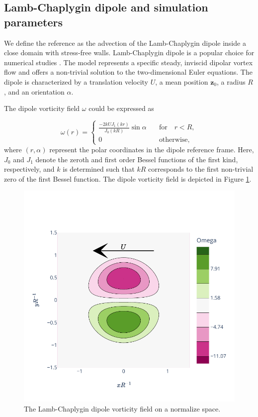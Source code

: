 \subsection{Lamb-Chaplygin dipole and simulation parameters}

We define the reference as the advection of the Lamb-Chaplygin dipole inside a close domain with stress-free walls. Lamb-Chaplygin dipole is a popular choice for numerical studies \cite{orlandi_vortex_1990}. The model represents a specific steady, inviscid dipolar vortex flow and offers a non-trivial solution to the two-dimensional Euler equations. The dipole is characterized by a translation velocity $U$, a mean position $\bm{z}_0$, a radius $R$, and an orientation $\alpha$.

The dipole vorticity field $\omega$ could be expressed as

\begin{equation*}
	\omega(r) = \begin{cases}
		\frac{-2 k U J_1(kr)}{J_0(kR)} \sin \alpha \quad & \text{for} \quad  r < R, \\
		0 \quad                                          & \text{otherwise},
	\end{cases}
\end{equation*}where $(r, \alpha)$ represent the polar coordinates in the dipole reference frame. Here, $J_0$ and $J_1$ denote the zeroth and first order Bessel functions of the first kind, respectively, and $k$ is determined such that $kR$ corresponds to the first non-trivial zero of the first Bessel function.  The dipole vorticity field is depicted in Figure \ref{fig:lamb_dipole}.

\begin{figure}[ht]
	\centering
	\includegraphics[width=0.6\linewidth]{images/app2d/lamb.pdf}
	\caption{The Lamb-Chaplygin dipole vorticity field on a normalize space.}
	\label{fig:lamb_dipole}
\end{figure}

